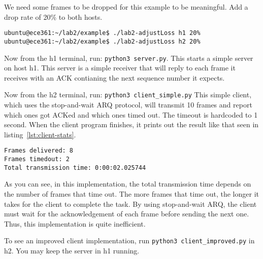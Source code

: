 \documentclass[11pt]{article}
\begin{document}
We need some frames to be dropped for this example to be meaningful. Add a drop rate of 20\% to both hosts.
\begin{lstlisting}[style=ece361shell, caption={}]
ubuntu@ece361:~/lab2/example$ ./lab2-adjustLoss h1 20%
ubuntu@ece361:~/lab2/example$ ./lab2-adjustLoss h2 20%
\end{lstlisting}

Now from the h1 terminal, run: \texttt{python3 server.py}.
This starts a simple server on host h1. This server is a simple receiver that will reply to each frame it receives with an ACK contianing the next sequence number it expects.

Now from the h2 terminal, run: \texttt{python3 client\_simple.py}
This simple client, which uses the stop-and-wait ARQ protocol, will transmit 10 frames and report which ones got ACKed and which ones timed out.
The timeout is hardcoded to 1 second. When the client program finishes, it prints out the result like that seen in listing~\ref{lst:client-stats}.
\begin{lstlisting}[style=ece361shell, caption={}, label={lst:client-stats}]
Frames delivered: 8
Frames timedout: 2
Total transmission time: 0:00:02.025744
\end{lstlisting}

As you can see, in this implementation, the total transmission time depends on the number of frames that time out.
The more frames that time out, the longer it takes for the client to complete the task.
By using stop-and-wait ARQ, the client must wait for the acknowledgement of each frame before sending the next one.
Thus, this implementation is quite inefficient.

To see an improved client implementation, run \texttt{python3 client\_improved.py} in h2. You may keep the server in h1 running.
\end{document}
